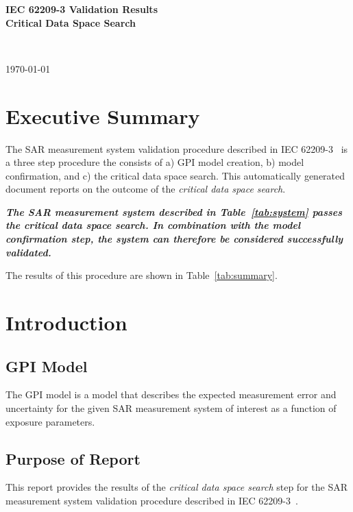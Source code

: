 \documentclass{article}
\begin{document}
\flushright
\begin{Large}
\textbf{IEC 62209-3 Validation Results} \\
\vspace{3pt}
\textbf{Critical Data Space Search}
\end{Large} \\
\begin{small}
\today \\ \currenttime
\end{small}
\flushleft

\section{Executive Summary}\label{sec:exec_summary}
The SAR measurement system validation procedure described in IEC 62209-3~\cite{standard} is a three step procedure the consists of a) GPI model creation, b) model confirmation, and c) the critical data space search. This automatically generated document reports on the outcome of the \textit{critical data space search}.

\textbf{\textit{The SAR measurement system described in Table~\ref{tab:system} passes the critical data space search. In combination with the model confirmation step, the system can therefore be considered successfully validated.}}

The results of this procedure are shown in Table~\ref{tab:summary}.





\section{Introduction}\label{sec:start}
\subsection{GPI Model}
The GPI model is a model that describes the expected measurement error and uncertainty for the given SAR measurement system of interest as a function of exposure parameters.

\subsection{Purpose of Report}\label{sec:intro}
This report provides the results of the \textit{critical data space search} step for the SAR measurement system validation procedure described in IEC 62209-3~\cite{standard}.
\end{document}
